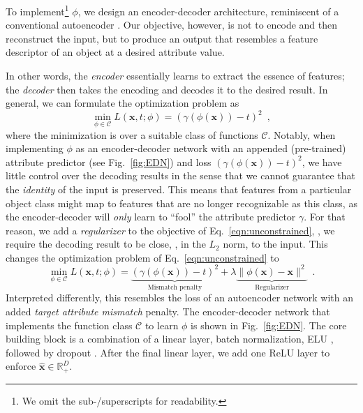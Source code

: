 \documentclass[10pt,twocolumn,letterpaper]{article}
\begin{document}
To implement\footnote{We omit the sub-/superscripts for readability.} $\phi$, we design an encoder-decoder
architecture, reminiscent of a conventional autoencoder \cite{Bengio09a}.
Our objective, however, is not to encode and then reconstruct 
the input, but to produce an output that 
resembles a feature descriptor of an object at a 
desired attribute value.

In other words, the \emph{encoder} essentially learns to extract
the essence of features; the \emph{decoder}
then takes the encoding and decodes it to the desired result. In
general, we can formulate the optimization problem as
\begin{equation}
\min_{\phi \in \mathcal{C}} L(\mathbf{x},t; \phi) = (\gamma(\phi(\mathbf{x}))-t)^2\enspace,
\label{eqn:unconstrained}
\end{equation}
where the minimization is 
over a suitable class of functions $\mathcal{C}$. Notably, when 
implementing $\phi$ as an encoder-decoder network with an 
appended (pre-trained) attribute predictor (see Fig.~\ref{fig:EDN})
and loss $(\gamma(\phi(\mathbf{x}))-t)^2$, we have little control 
over the decoding results in the sense that we cannot guarantee 
that the \emph{identity} of the input is preserved. This means
that features from a particular object class might map to 
features that are no longer recognizable as
this class, as the encoder-decoder will \emph{only} learn to ``fool'' the 
attribute predictor $\gamma$.
For that reason, we add a \emph{regularizer} to the objective
of Eq.~\eqref{eqn:unconstrained}, \ie, we require the 
decoding result to be close, \eg, in the $L_2$ norm, to the
input. This changes the optimization problem of Eq.~\eqref{eqn:unconstrained} to
\begin{equation}
\min_{\phi \in \mathcal{C}} L(\mathbf{x},t; \phi) = \underbrace{(\gamma(\phi(\mathbf{x}))-t)^2}_\text{Mismatch penalty} + 
\lambda \underbrace{\| \phi(\mathbf{x}) - \mathbf{x} \|^2}_{\text{Regularizer}}
\enspace.
\label{eqn:constrained}
\end{equation}
Interpreted differently, this resembles the loss of an autoencoder 
network with an added \emph{target attribute mismatch} penalty. 
The encoder-decoder network that implements the function class $\mathcal{C}$ 
to learn $\phi$ is shown in Fig.~\ref{fig:EDN}. 
The core building block is a combination of a linear layer, 
batch normalization, ELU \cite{Clevert16a}, followed by dropout 
\cite{Srivastava14a}. After the final linear
layer, we add one ReLU layer to enforce $\hat{\mathbf{x}} \in \mathbb{R}^D_+$.
\end{document}
